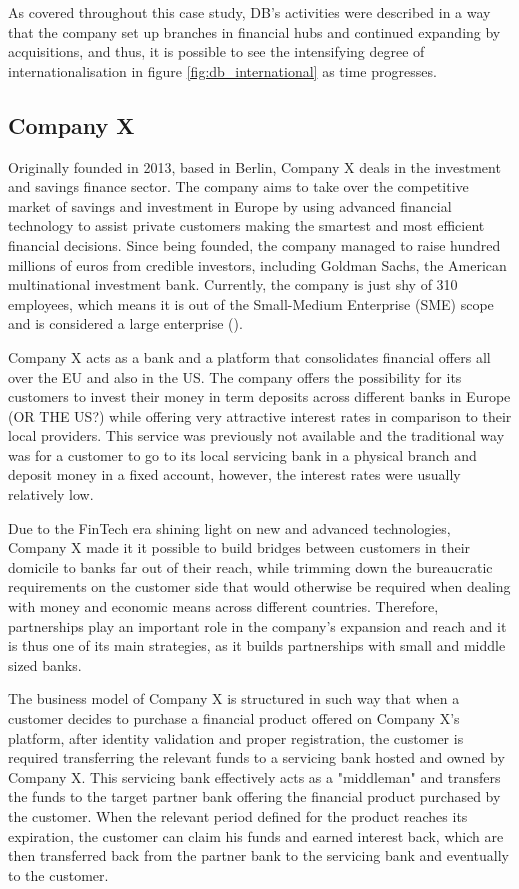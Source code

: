 \documentclass[11pt,a4paper]{article}
\begin{document}
{{As covered throughout this case study, DB's activities were described in a way that the company set up branches in financial hubs and continued expanding by acquisitions, and thus, it is possible to see the intensifying degree of internationalisation in figure \ref{fig:db_international} as time progresses.


\subsection{Company X}
Originally founded in 2013, based in Berlin, Company X deals in the investment and savings finance sector. The company aims to take over the competitive market of savings and investment in Europe by using advanced financial technology to assist private customers making the smartest and most efficient financial decisions. Since being founded, the company managed to raise hundred millions of euros from credible investors, including Goldman Sachs, the American multinational investment bank. Currently, the company is just shy of 310 employees, which means it is out of the Small-Medium Enterprise (SME) scope and is considered a large enterprise (\cite{majocchiFirmSizeBusiness2005}).
 \par Company X acts as a bank and a platform that consolidates financial offers all over the EU and also in the US. The company offers the possibility for its customers to invest their money in term deposits across different banks in Europe (OR THE US?) while offering very attractive interest rates in comparison to their local providers. This service was previously not available and the traditional way was for a customer to go to its local servicing bank in a physical branch and deposit money in a fixed account, however, the interest rates were usually relatively low. \par 
Due to the FinTech era shining light on new and advanced technologies, Company X made it it possible to build bridges between customers in their domicile to banks far out of their reach, while trimming down the bureaucratic requirements on the customer side that would otherwise be required when dealing with money and economic means across different countries. Therefore, partnerships play an important role in the company's expansion and reach and it is thus one of its main strategies, as it builds partnerships with small and middle sized banks.  \par
The business model of Company X is structured in such way that when a customer decides to purchase a financial product offered on Company X's platform, after identity validation and proper registration, the customer is required transferring the relevant funds to a servicing bank hosted and owned by Company X. This servicing bank effectively acts as a "middleman" and transfers the funds to the target partner bank offering the financial product purchased by the customer. When the relevant period defined for the product reaches its expiration, the customer can claim his funds and earned interest back, which are then transferred back from the partner bank to the servicing bank and eventually to the customer. \par 
}}
\end{document}
